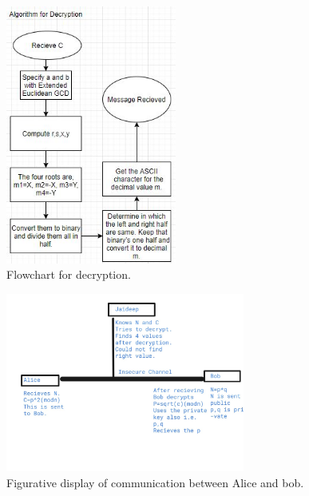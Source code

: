 \documentclass[12pt,a4paper]{article}
\begin{document}
\begin{figure}[htbp]
  \centering
  \includegraphics[width=0.5\textwidth]{Decrypt.JPG}
  \caption{Flowchart for decryption.}
  \label{fig:Decrypt}
\end{figure}

\begin{figure}[htbp]
  \centering
  \includegraphics[width=0.7\textwidth]{Alice and Bob.jpg}
  \caption{Figurative display of communication between Alice and bob.}
  \label{fig:Alice and Bob}
\end{figure}

\end{document}
